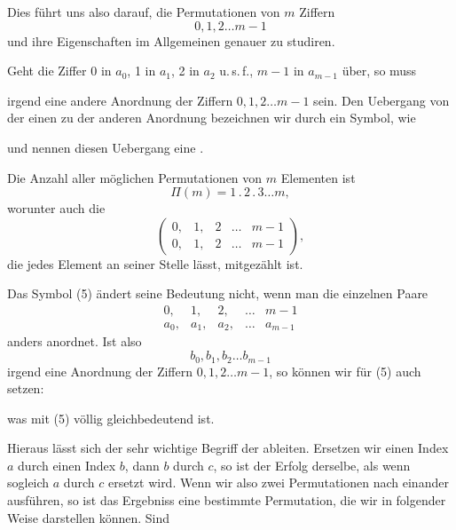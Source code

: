 
Dies führt uns also darauf, die Permutationen von $m$ Ziffern
\[
0, 1, 2 \ldots m-1
\]
und ihre Eigenschaften im Allgemeinen genauer zu studiren.

Geht die Ziffer 0 in $a_0$, 1 in $a_1$, 2 in $a_2$ u.\,s.\,f., $m-1$ in
$a_{m-1}$ über, so muss


irgend eine andere Anordnung der Ziffern $0, 1, 2 \ldots m-1$ sein. Den
Uebergang von der einen zu der anderen Anordnung bezeichnen wir durch
ein Symbol, wie


und nennen diesen Uebergang eine .

Die Anzahl aller möglichen Permutationen von $m$ Elementen ist
\[
\Pi(m) = 1 \,.\, 2 \,.\, 3 \ldots m,
\]
worunter auch die 
\[
\begin{pmatrix} 0, & 1, & 2 & \ldots & m-1 \\ 0, & 1, & 2 & \ldots & m-1 \end{pmatrix},
\]
die jedes Element an seiner Stelle lässt, mitgezählt ist.

Das Symbol (5) ändert seine Bedeutung nicht, wenn man die einzelnen
Paare
\[
\begin{array}{ccccc}
0, & 1, & 2, & \ldots & m-1 \\
a_0, & a_1, & a_2, & \ldots & a_{m-1}
\end{array}
\]
anders anordnet. Ist also
\[
b_0, b_1, b_2 \ldots b_{m-1}
\]
irgend eine Anordnung der Ziffern $0, 1, 2 \ldots m-1$, so können wir
für (5) auch setzen:


was mit (5) völlig gleichbedeutend ist.

Hieraus lässt sich der sehr wichtige Begriff der  ableiten. Ersetzen wir einen Index $a$ durch einen Index
$b$, dann $b$ durch $c$, so ist der Erfolg derselbe, als wenn sogleich
$a$ durch $c$ ersetzt wird. Wenn wir also zwei Permutationen nach
einander ausführen, so ist das Ergebniss eine bestimmte Permutation,
die wir in folgender Weise darstellen können. Sind
